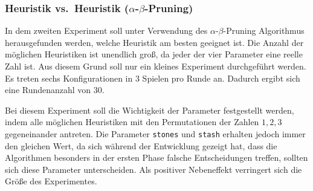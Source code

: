 \documentclass[11pt]{article}
\begin{document}
{    \hypertarget{heuristik-vs.heuristik-ux3b1-ux3b2-pruning}{%
\subsubsection{Heuristik vs.~Heuristik
($\alpha$-$\beta$-Pruning)}\label{heuristik-vs.heuristik-ux3b1-ux3b2-pruning}}

In dem zweiten Experiment soll unter Verwendung des $\alpha$-$\beta$-Pruning
Algorithmus herausgefunden werden, welche Heuristik am besten geeignet
ist. Die Anzahl der möglichen Heuristiken ist unendlich groß, da jeder
der vier Parameter eine reelle Zahl ist. Aus diesem Grund soll nur ein
kleines Experiment durchgeführt werden. Es treten sechs Konfigurationen
in 3 Spielen pro Runde an. Dadurch ergibt sich eine Rundenanzahl von 30.

Bei diesem Experiment soll die Wichtigkeit der Parameter festgestellt
werden, indem alle möglichen Heuristiken mit den Permutationen der
Zahlen \(1, 2, 3\) gegeneinander antreten. Die Parameter \texttt{stones}
und \texttt{stash} erhalten jedoch immer den gleichen Wert, da sich
während der Entwicklung gezeigt hat, dass die Algorithmen besonders in
der ersten Phase falsche Entscheidungen treffen, sollten sich diese
Parameter unterscheiden. Als positiver Nebeneffekt verringert sich die
Größe des Experimentes.

}
\end{document}
